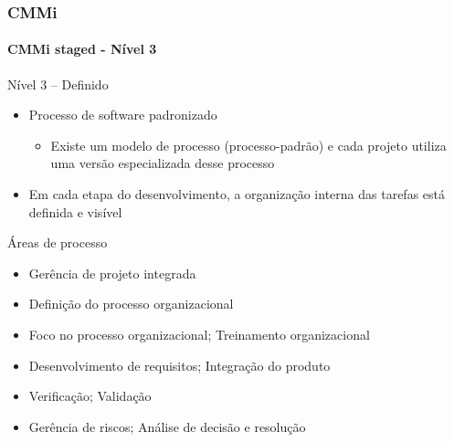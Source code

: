\begin{frame}
	\frametitle{CMMi}
	\framesubtitle{CMMi staged - Nível 3}
	
	\begin{block:fact}{Nível 3 -- Definido}
		\begin{itemize}
			\item Processo de software padronizado
			\begin{itemize}
				\item Existe um modelo de processo (processo-padrão) e cada projeto
				utiliza uma versão especializada desse processo
			\end{itemize}
			\item Em cada etapa do desenvolvimento, a organização interna das tarefas
			está definida e visível
		\end{itemize}
	\end{block:fact}
	
	\begin{block:fact}{Áreas de processo}
		\begin{itemize}
			\small
			\item Gerência de projeto integrada
			\item Definição do processo organizacional
			\item Foco no processo organizacional; Treinamento organizacional
			\item Desenvolvimento de requisitos; Integração do produto
			\item Verificação;  Validação
			\item Gerência de riscos; Análise de decisão e resolução
		\end{itemize}
	\end{block:fact}
\end{frame}

